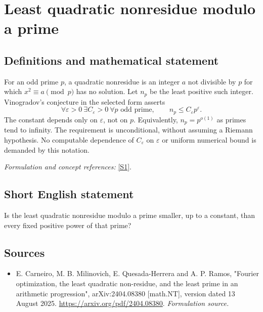 \documentclass[11pt]{article}
\begin{document}
\section*{Least quadratic nonresidue modulo a prime}\label{statement}
\subsection{Definitions and mathematical statement}
For an odd prime $p$, a quadratic nonresidue is an integer $a$ not divisible by $p$ for which $x^2\equiv a\pmod p$ has no solution. Let $n_p$ be the least positive such integer. Vinogradov's conjecture in the selected form asserts
\[
 \forall{\varepsilon}>0\ \exists C_{\varepsilon}>0\ \forall p\text{ odd prime},
 \qquad n_p\le C_{\varepsilon} p^{\varepsilon}.
\]
The constant depends only on ${\varepsilon}$, not on $p$. Equivalently, $n_p=p^{o(1)}$ as primes tend to infinity. The requirement is unconditional, without assuming a Riemann hypothesis. No computable dependence of $C_{\varepsilon}$ on ${\varepsilon}$ or uniform numerical bound is demanded by this notation.
\par\smallskip\textit{Formulation and concept references:} \href{https://arxiv.org/pdf/2404.08380}{[S1]}.

\subsection{Short English statement}
Is the least quadratic nonresidue modulo a prime smaller, up to a constant, than every fixed positive power of that prime?
\subsection{Sources}
\begin{itemize}
\item[S1]E. Carneiro, M. B. Milinovich, E. Quesada-Herrera and A. P. Ramos, "Fourier optimization, the least quadratic non-residue, and the least prime in an arithmetic progression", arXiv:2404.08380 [math.NT], version dated 13 August 2025.
\url{https://arxiv.org/pdf/2404.08380}.
\textit{Formulation source.}
\end{itemize}
\end{document}
